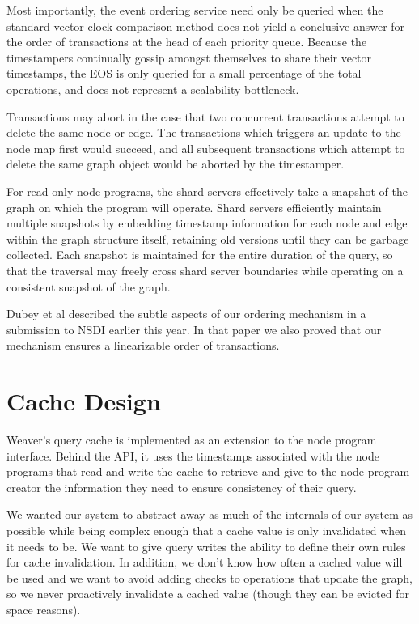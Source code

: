 \documentclass[letterpaper,twocolumn,11pt,tight]{article}
\begin{document}
Most importantly, the event ordering service need only be queried when
    the standard vector clock comparison method does not yield a conclusive
    answer for the order of transactions at the head of each priority queue.
Because the timestampers continually gossip amongst themselves to share
    their vector timestamps, the EOS is only queried for a small percentage of
    the total operations, and does not represent a scalability bottleneck.

Transactions may abort in the case that two concurrent transactions attempt
    to delete the same node or edge.
The transactions which triggers an update to the node map first would succeed,
    and all subsequent transactions which attempt to delete the same graph
    object would be aborted by the timestamper.

For read-only node programs, the shard servers effectively take a snapshot
    of the graph on which the program will operate.
Shard servers efficiently maintain multiple snapshots by embedding timestamp
    information for each node and edge within the graph structure itself,
    retaining old versions until they can be garbage collected.
Each snapshot is maintained for the entire duration of the query, so that the
    traversal may freely cross shard server boundaries while operating on
    a consistent snapshot of the graph.

Dubey et al described the subtle aspects of our ordering mechanism in a submission to NSDI earlier this year. In that paper we also proved that our mechanism ensures a linearizable order of transactions.

\section{Cache Design}\label{sec:cdesign}
Weaver's query cache is implemented as an extension to the node program interface. Behind the API, it uses the timestamps associated with the node programs that read and write the cache to retrieve and give to the node-program creator the information they need to ensure consistency of their query.

We wanted our system to abstract away as much of the internals of our system as possible while being complex enough that a cache value is only invalidated when it needs to be.
We want to give query writes the ability to define their own rules for cache invalidation.
In addition, we don't know how often a cached value will be used and we want to avoid adding checks to operations that update the graph, so we never proactively invalidate a cached value (though they can be evicted for space reasons).
\end{document}
